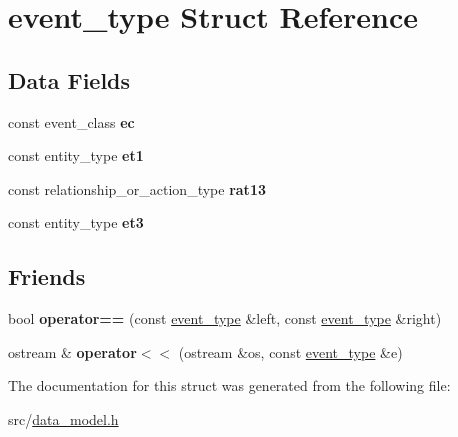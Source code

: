 \hypertarget{structevent__type}{}\section{event\+\_\+type Struct Reference}
\label{structevent__type}
\subsection*{Data Fields}
\begin{DoxyCompactItemize}
\item 
const event\+\_\+class {\bfseries ec}\hypertarget{structevent__type_a56c49b8b98c18fb39797a92285387eca}{}\label{structevent__type_a56c49b8b98c18fb39797a92285387eca}

\item 
const entity\+\_\+type {\bfseries et1}\hypertarget{structevent__type_a127abbfe7df2d4e442ef38c4d12b6dd2}{}\label{structevent__type_a127abbfe7df2d4e442ef38c4d12b6dd2}

\item 
const relationship\+\_\+or\+\_\+action\+\_\+type {\bfseries rat13}\hypertarget{structevent__type_a7fe60f7b335a887a54c37c4b9fcfb400}{}\label{structevent__type_a7fe60f7b335a887a54c37c4b9fcfb400}

\item 
const entity\+\_\+type {\bfseries et3}\hypertarget{structevent__type_a685ac2668f6698357089949c495f6fe3}{}\label{structevent__type_a685ac2668f6698357089949c495f6fe3}

\end{DoxyCompactItemize}
\subsection*{Friends}
\begin{DoxyCompactItemize}
\item 
bool {\bfseries operator==} (const \hyperlink{structevent__type}{event\+\_\+type} \&left, const \hyperlink{structevent__type}{event\+\_\+type} \&right)\hypertarget{structevent__type_ac6ea5340a97cf343356e390f082881de}{}\label{structevent__type_ac6ea5340a97cf343356e390f082881de}

\item 
ostream \& {\bfseries operator$<$$<$} (ostream \&os, const \hyperlink{structevent__type}{event\+\_\+type} \&e)\hypertarget{structevent__type_aaeec0fa308de88d46a6abc86499fe596}{}\label{structevent__type_aaeec0fa308de88d46a6abc86499fe596}

\end{DoxyCompactItemize}


The documentation for this struct was generated from the following file\+:\begin{DoxyCompactItemize}
\item 
src/\hyperlink{data__model_8h}{data\+\_\+model.\+h}\end{DoxyCompactItemize}
